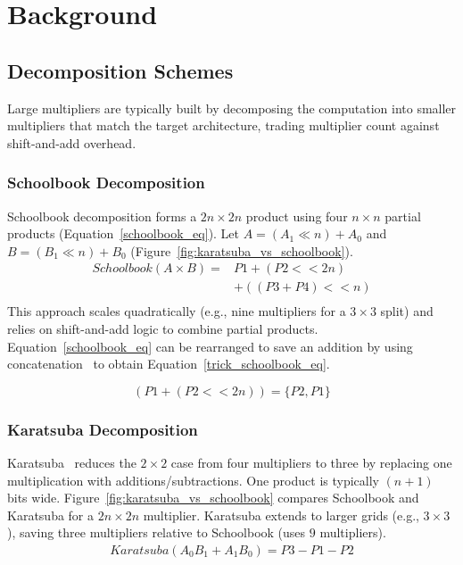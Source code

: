 \section{Background} \label{sec_background}
\subsection{Decomposition Schemes}
Large multipliers are typically built by decomposing the computation into smaller multipliers that match the target architecture, trading multiplier count against shift-and-add overhead.
\subsubsection{Schoolbook Decomposition}
Schoolbook decomposition forms a $2n\times 2n$ product using four $n\times n$ partial products (Equation~\ref{schoolbook_eq}). Let $A=(A_1\ll n)+A_0$ and $B=(B_1\ll n)+B_0$ (Figure~\ref{fig:karatsuba_vs_schoolbook}).
\begin{equation} \label{schoolbook_eq}
\begin{split}
    \mathit{Schoolbook}(A \times B) = & P1 +(P2 << 2n) \\
                &+ ((P3+ P4) << n) \\
\end{split}
\end{equation}
This approach scales quadratically (e.g., nine multipliers for a $3\times 3$ split) and relies on shift-and-add logic to combine partial products.
Equation~\ref{schoolbook_eq} can be rearranged to save an addition by using concatenation~\cite{zhangIMpressLargeInteger2022} to obtain Equation~\ref{trick_schoolbook_eq}.


\begin{equation} \label{trick_schoolbook_eq}
    (P1 +(P2 << 2n)) = \{P2, P1\}
\end{equation}

\subsubsection{Karatsuba Decomposition}
Karatsuba~\cite{karatsubaOriginalPaper} reduces the $2\times2$ case from four multipliers to three by replacing one multiplication with additions/subtractions.
One product is typically $(n{+}1)$ bits wide.
Figure~\ref{fig:karatsuba_vs_schoolbook} compares Schoolbook and Karatsuba for a $2n \times 2n$ multiplier. 
Karatsuba extends to larger grids (e.g., $3\times3$), saving three multipliers relative to Schoolbook (uses $9$ multipliers).
\begin{equation} \label{karatsuba_eq}
\begin{split}
    \mathit{Karatsuba}(A_0  B_1 + A_1  B_0) = P3-P1-P2
\end{split}
\end{equation}


